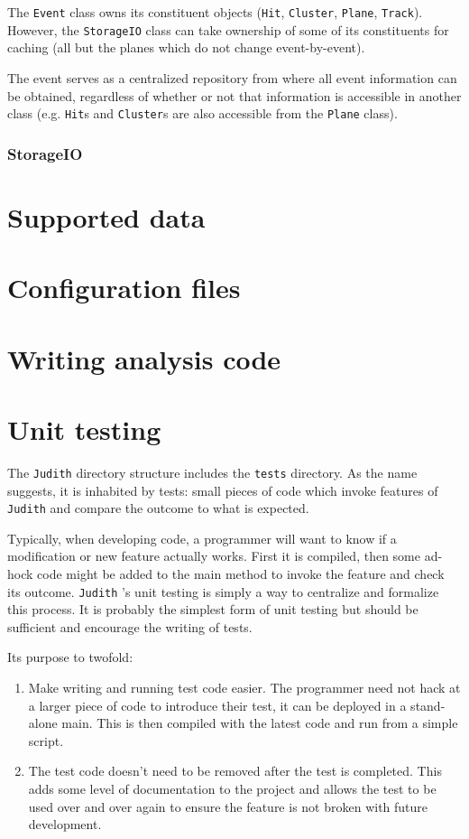 \documentclass[10pt,a4paper]{book}
\newcommand{\Judith}{\Verb`Judith` }
\begin{document}
The \Verb`Event` class owns its constituent objects (\Verb`Hit`, \Verb`Cluster`, \Verb`Plane`, \Verb`Track`). However, the \Verb`StorageIO` class can take ownership of some of its constituents for caching (all but the planes which do not change event-by-event).

The event serves as a centralized repository from where all event information can be obtained, regardless of whether or not that information is accessible in another class (e.g. \Verb`Hit`s and \Verb`Cluster`s are also accessible from the \Verb`Plane` class).

\subsection{StorageIO}

\chapter{Supported data}

\chapter{Configuration files}

\chapter{Writing analysis code}

\chapter{Unit testing}
\label{ch:unittesting}

The \Judith directory structure includes the \Verb`tests` directory. As the name suggests, it is inhabited by tests: small pieces of code which invoke features of \Judith and compare the outcome to what is expected.

Typically, when developing code, a programmer will want to know if a modification or new feature actually works. First it is compiled, then some ad-hock code might be added to the main method to invoke the feature and check its outcome. \Judith's unit testing is simply a way to centralize and formalize this process. It is probably the simplest form of unit testing but should be sufficient and encourage the writing of tests.

Its purpose to twofold:

\begin{enumerate}
	\item Make writing and running test code easier. The programmer need not hack at a larger piece of code to introduce their test, it can be deployed in a stand-alone main. This is then compiled with the latest code and run from a simple script.
	\item The test code doesn't need to be removed after the test is completed. This adds some level of documentation to the project and allows the test to be used over and over again to ensure the feature is not broken with future development.
\end{enumerate}
\end{document}
